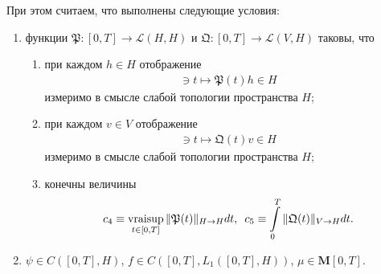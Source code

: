 \documentclass{report}
\newcommand{\vraisup}{\mathop{\rm vraisup}}
\begin{document}
При этом считаем, что выполнены следующие условия:
\begin{enumerate}
\item функции $\mathfrak{P}:[0,T]\to\mathcal{L}(H,H)$ и $\mathfrak{Q}:[0,T]\to\mathcal{L}(V,H)$ таковы, что 
{
\renewcommand{\theenumii}{\asbuk{enumii}}
\renewcommand{\labelenumii}{\theenumii)}
\begin{enumerate}
\item при каждом $h\in H$ отображение 
\begin{gather*}
[0,T]\ni t\mapsto\mathfrak{P}(t)h\in H
\end{gather*}
измеримо в смысле слабой топологии пространства $H$; 

\item при каждом $v\in V$ отображение 
\begin{gather*}
[0,T]\ni t\mapsto\mathfrak{Q}(t)v\in H
\end{gather*}
измеримо в смысле слабой топологии пространства $H$;

\item конечны величины
\begin{gather*}
c_4\equiv\vraisup\limits_{t\in[0,T]}\|\mathfrak{P}(t)\|_{H\to H}dt,\,\,\,c_5\equiv\int\limits_0^T\|\mathfrak{Q}(t)\|_{V\to H}dt.
\end{gather*}
\end{enumerate}
} 

\item $\psi\in C([0,T],H)$, $f\in C([0,T],L_1([0,T],H))$, $\mu\in\mathbf{M}[0,T]$.
\end{enumerate}
\end{document}
